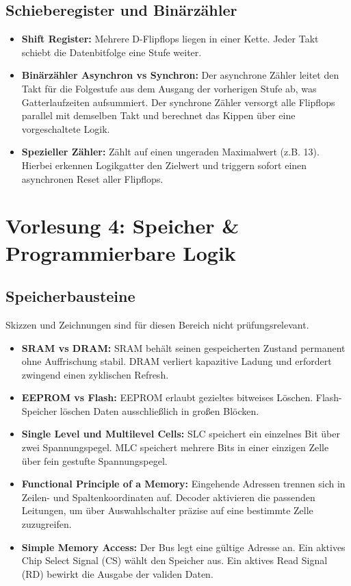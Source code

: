 \documentclass[11pt,a4paper]{article}
\begin{document}
\subsection{Schieberegister und Binärzähler}
\begin{itemize}
    \item \textbf{Shift Register:} Mehrere D-Flipflops liegen in einer Kette. Jeder Takt schiebt die Datenbitfolge eine Stufe weiter.
    \item \textbf{Binärzähler Asynchron vs Synchron:} Der asynchrone Zähler leitet den Takt für die Folgestufe aus dem Ausgang der vorherigen Stufe ab, was Gatterlaufzeiten aufsummiert. Der synchrone Zähler versorgt alle Flipflops parallel mit demselben Takt und berechnet das Kippen über eine vorgeschaltete Logik.
    \item \textbf{Spezieller Zähler:} Zählt auf einen ungeraden Maximalwert (z.B. 13). Hierbei erkennen Logikgatter den Zielwert und triggern sofort einen asynchronen Reset aller Flipflops.
\end{itemize}

\newpage

\section{Vorlesung 4: Speicher \& Programmierbare Logik}

\subsection{Speicherbausteine}
Skizzen und Zeichnungen sind für diesen Bereich nicht prüfungsrelevant.
\begin{itemize}
    \item \textbf{SRAM vs DRAM:} SRAM behält seinen gespeicherten Zustand permanent ohne Auffrischung stabil. DRAM verliert kapazitive Ladung und erfordert zwingend einen zyklischen Refresh.
    \item \textbf{EEPROM vs Flash:} EEPROM erlaubt gezieltes bitweises Löschen. Flash-Speicher löschen Daten ausschließlich in großen Blöcken.
    \item \textbf{Single Level und Multilevel Cells:} SLC speichert ein einzelnes Bit über zwei Spannungspegel. MLC speichert mehrere Bits in einer einzigen Zelle über fein gestufte Spannungspegel.
    \item \textbf{Functional Principle of a Memory:} Eingehende Adressen trennen sich in Zeilen- und Spaltenkoordinaten auf. Decoder aktivieren die passenden Leitungen, um über Auswahlschalter präzise auf eine bestimmte Zelle zuzugreifen.
    \item \textbf{Simple Memory Access:} Der Bus legt eine gültige Adresse an. Ein aktives Chip Select Signal (CS) wählt den Speicher aus. Ein aktives Read Signal (RD) bewirkt die Ausgabe der validen Daten.
\end{itemize}
\end{document}
